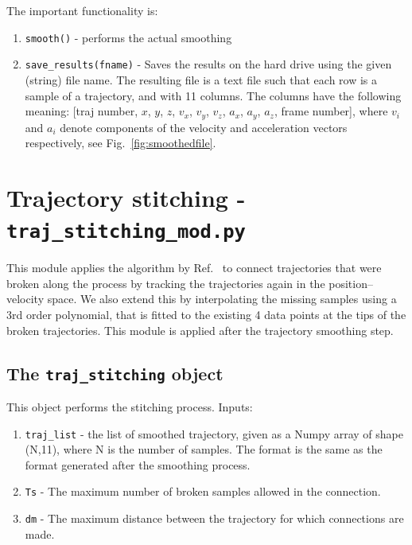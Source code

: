 \documentclass[10pt,a4paper]{article}
\begin{document}
The important functionality is:

\begin{enumerate}
	\item \texttt{smooth()} - performs the actual smoothing
	\item \texttt{save\_results(fname)} - Saves the results on the hard drive using the given (string) file name. The resulting file is a text file such that each row is a sample of a trajectory, and with 11 columns. The columns have the following meaning:
	[traj number, $x$, $y$, $z$, $v_x$, $v_y$, $v_z$, $a_x$, $a_y$, $a_z$, frame number], where $v_i$ and $a_i$ denote components of the velocity and acceleration vectors respectively, see Fig.~\ref{fig:smoothedfile}.
\end{enumerate}







\section{Trajectory stitching - \texttt{traj\_stitching\_mod.py}}\label{sec:stitching}

This module applies the algorithm by Ref.~\cite{Xu2008} to connect trajectories that were broken along the process by tracking the trajectories again in the position--velocity space. We also extend this by interpolating the missing samples using a 3rd order polynomial, that is fitted to the existing 4 data points at the tips of the broken trajectories. This module is applied after the trajectory smoothing step.




\subsection{The \texttt{traj\_stitching} object}

This object performs the stitching process. Inputs:

\begin{enumerate}
	\item \texttt{traj\_list} - the list of smoothed trajectory, given as a Numpy array of shape (N,11), where N is the number of samples. The format is the same as the format generated after the smoothing process.
	\item \texttt{Ts} - The maximum number of broken samples allowed in the connection.
	\item \texttt{dm} - The maximum distance between the trajectory for which connections are made.
\end{enumerate}
\end{document}
